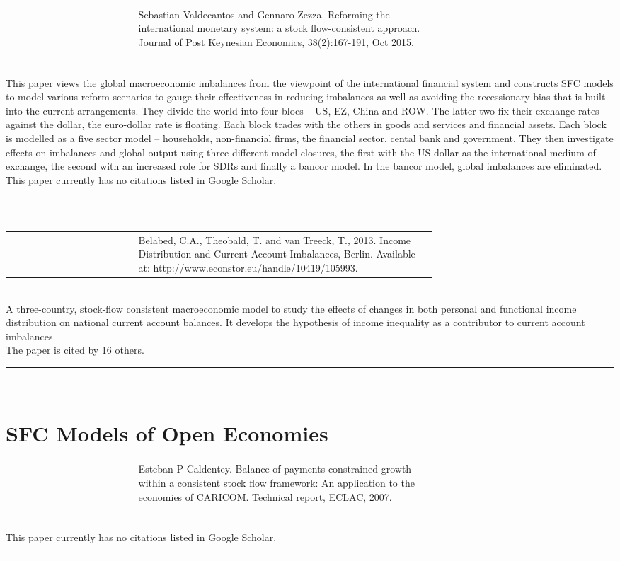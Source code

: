\documentclass[twoside,a4paper,11pt]{article}
\begin{document}
\raggedright \begin{tabular}{lp{0.7\linewidth}}
\cite{Valdecantos2015b}  & Sebastian Valdecantos and Gennaro Zezza. Reforming the international monetary system: a stock flow-consistent approach. Journal of Post Keynesian Economics, 38(2):167-191, Oct 2015.
\end{tabular}\\[5pt]
This paper views the global macroeconomic imbalances from  the viewpoint of the international financial system and constructs SFC models to model various reform scenarios to gauge their effectiveness in reducing imbalances as well as avoiding the recessionary bias that is built into the current arrangements. They divide the world into four blocs -- US, EZ, China and ROW. The latter two fix their exchange rates against the dollar, the euro-dollar rate is floating. Each block trades with the others in goods and services and financial assets. Each block is modelled  as a five sector model -- households, non-financial firms, the financial sector, cental bank and government. They then investigate effects on imbalances and global output using three different model closures, the first with the US dollar as the international medium of exchange, the second with an increased role for SDRs and finally a bancor model. In the bancor model, global imbalances are eliminated.\\[5pt]
This paper currently has no citations listed in Google Scholar.\\
\centering \rule{5cm}{1pt}  \\[1cm]


\raggedright \begin{tabular}{lp{0.7\linewidth}}
\cite{Belabed2014} & Belabed, C.A., Theobald, T. and van Treeck, T., 2013. Income Distribution and Current Account Imbalances, Berlin. Available at: http://www.econstor.eu/handle/10419/105993.
\end{tabular}\\[5pt]
A three-country, stock-flow consistent macroeconomic model to study the effects of changes in both personal and functional income distribution on national current account balances. It develops the hypothesis of income inequality as a contributor to current account imbalances.\\[5pt]
The paper is cited by 16 others.\\
\centering \rule{5cm}{1pt}  \\[1cm]

\raggedright \section{SFC Models of Open Economies}
\begin{tabular}{lp{0.7\linewidth}}
\cite{Caldentey2007}  & Esteban P Caldentey. Balance of payments constrained growth within a consistent stock flow framework: An application to the economies of CARICOM. Technical report, ECLAC, 2007.
\end{tabular}\\[5pt]
This paper currently has no citations listed in Google Scholar.\\
\centering \rule{5cm}{1pt}  \\[1cm]
\end{document}
